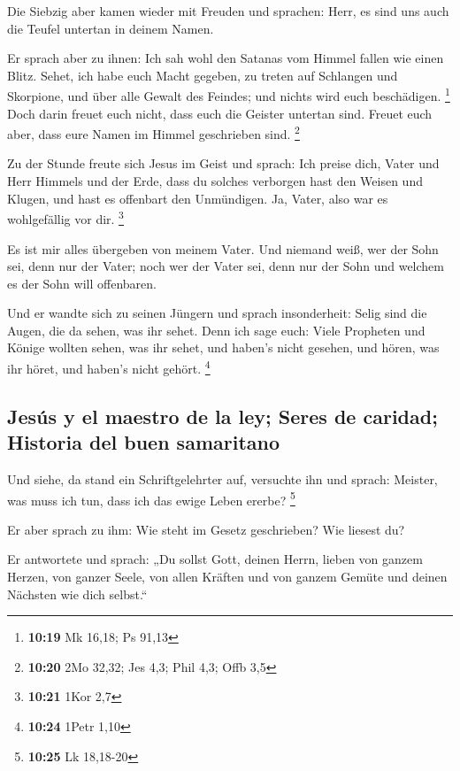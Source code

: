  Die Siebzig aber kamen wieder mit Freuden und sprachen:
Herr, es sind uns auch die Teufel untertan in deinem Namen.

 Er sprach aber zu ihnen: Ich sah wohl den Satanas vom
Himmel fallen wie einen Blitz.  Sehet, ich habe euch
Macht gegeben, zu treten auf Schlangen und Skorpione, und über alle
Gewalt des Feindes; und nichts wird euch beschädigen. \footnote{\textbf{10:19}
  Mk 16,18; Ps 91,13}  Doch darin freuet euch nicht, dass
euch die Geister untertan sind. Freuet euch aber, dass eure Namen im
Himmel geschrieben sind. \footnote{\textbf{10:20} 2Mo 32,32; Jes 4,3;
  Phil 4,3; Offb 3,5}

 Zu der Stunde freute sich Jesus im Geist und sprach: Ich
preise dich, Vater und Herr Himmels und der Erde, dass du solches
verborgen hast den Weisen und Klugen, und hast es offenbart den
Unmündigen. Ja, Vater, also war es wohlgefällig vor dir. \footnote{\textbf{10:21}
  1Kor 2,7}

 Es ist mir alles übergeben von meinem Vater. Und niemand
weiß, wer der Sohn sei, denn nur der Vater; noch wer der Vater sei, denn
nur der Sohn und welchem es der Sohn will offenbaren.

 Und er wandte sich zu seinen Jüngern und sprach
insonderheit: Selig sind die Augen, die da sehen, was ihr sehet.
 Denn ich sage euch: Viele Propheten und Könige wollten
sehen, was ihr sehet, und haben's nicht gesehen, und hören, was ihr
höret, und haben's nicht gehört. \footnote{\textbf{10:24} 1Petr 1,10}

\hypertarget{jesuxfas-y-el-maestro-de-la-ley-seres-de-caridad-historia-del-buen-samaritano}{%
\subsection{Jesús y el maestro de la ley; Seres de caridad; Historia del
buen
samaritano}\label{jesuxfas-y-el-maestro-de-la-ley-seres-de-caridad-historia-del-buen-samaritano}}

 Und siehe, da stand ein Schriftgelehrter auf, versuchte
ihn und sprach: Meister, was muss ich tun, dass ich das ewige Leben
ererbe? \footnote{\textbf{10:25} Lk 18,18-20}

 Er aber sprach zu ihm: Wie steht im Gesetz geschrieben?
Wie liesest du?

 Er antwortete und sprach: „Du sollst Gott, deinen Herrn,
lieben von ganzem Herzen, von ganzer Seele, von allen Kräften und von
ganzem Gemüte und deinen Nächsten wie dich selbst.``

